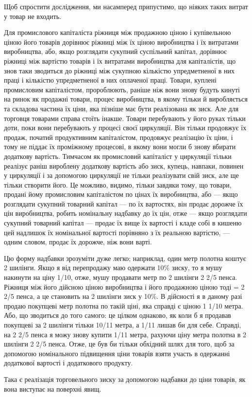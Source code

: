 \parcont{}  %
Щоб спростити дослідження, ми насамперед припустимо, що
ніяких таких витрат у товар не входить.

Для промислового капіталіста ріжниця між продажною ціною
і купівельною ціною його товарів дорівнює ріжниці між їх ціною
виробництва і їх витратами виробництва, або, якщо розглядати
сукупний суспільний капітал, дорівнює ріжниці між
вартістю товарів і їх витратами виробництва для капіталістів,
що знов таки зводиться до ріжниці між сукупною кількістю
упредметненої в них праці і кількістю упредметненої в них
оплаченої праці. Товари, куплені промисловим капіталістом, пророблюють,
раніше ніж вони знову будуть кинуті на ринок як
продажні товари, процес виробництва, в якому тільки й виробляється
та складова частина їх ціни, яка пізніше має бути
реалізована як зиск. Але для торговця товарами справа стоїть
інакше. Товари перебувають у його руках тільки доти, поки
вони перебувають у процесі своєї циркуляції. Він тільки продовжує
їх продаж, початий продуктивним капіталістом, продовжує
реалізацію їх ціни, і тому не піддає їх проміжному процесові,
в якому вони могли б знову вбирати додаткову вартість. Тимчасом
як промисловий капіталіст у циркуляції тільки реалізує
раніш вироблену додаткову вартість або зиск, купець, навпаки,
повинен у циркуляції і за допомогою циркуляції не тільки реалізувати
свій зиск, але ще тільки створити його. Це можливо,
видимо, тільки завдяки тому, що товари, продані йому промисловим
капіталістом по цінах їх виробництва, або — якщо розглядати
сукупний товарний капітал — по їх вартостях, він продає
дорожче їх цін виробництва, робить номінальну надбавку до
їх цін, отже — якщо розглядати сукупний товарний капітал —
продає їх вище їх вартості і кладе собі в кишеню цей надлишок
їх номінальної вартості порівняно з їх реальною вартістю, — одним
словом, продає їх дорожче, ніж вони варті.

Цю форму надбавки зрозуміти дуже легко; наприклад, один
метр полотна коштує 2 шилінги. Якщо я від перепродажу маю
одержати 10\% зиску, то я мушу накинути на ціну 1/10, отже,
мушу продавати метр по 2 шилінги 2 2/5 пенса. Ріжниця між його
дійсною ціною виробництва і його продажною ціною тоді = 2 2/5
пенса, а це становить на 2 шилінги зиск у 10\%. В дійсності
я в даному разі продаю покупцеві метр полотна по такій ціні,
яка справді є ціною 1 1/10 метра. Або, що зводиться до того
самого: це цілком однаково, як коли б я продавав покупцеві за
2 шилінги тільки 10/11 метра, а 1/11 лишав би для себе. Справді, на
2 2/5 пенса я можу знову купити 1/11 метра, рахуючи ціну метра
полотна в 2 шилінги 2 2/5 пенса. Отже, це був би тільки обхідний
шлях для того, щоб за допомогою номінального підвищення
ціни товарів взяти участь в одержанні додаткової вартості і додаткового
продукту.

Така є реалізація торговельного зиску за допомогою надбавки
до ціни товарів, як вона виступає на поверхні явищ.
\parbreak{}  %
